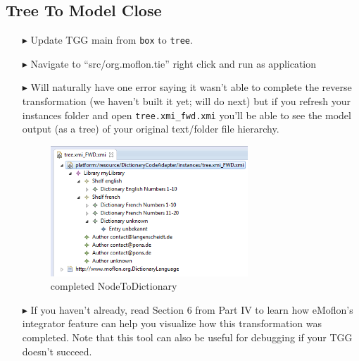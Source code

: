 \newpage
\hypertarget{t2m close}{}
\subsection{Tree To Model Close}
\genHeader

\begin{itemize}

\item[$\blacktriangleright$] Update TGG main from \texttt{box} to \texttt{tree}.

\item[$\blacktriangleright$] Navigate to ``src/org.moflon.tie'' right click and run as application

\item[$\blacktriangleright$] Will naturally have one error saying it wasn't able to complete the reverse transformation (we haven't built it yet; will do next)
but if you refresh your instances folder and open \texttt{tree.xmi\_fwd.xmi} you'll be able to see the model output (as a tree) of your original text/folder
file hierarchy.

\begin{figure}[htbp]
\begin{center}
  \includegraphics[width=0.7\textwidth]{ea_modelToTreeResult}
  \caption{completed NodeToDictionary}
  \label{ea:NodeToDictionary_Complete}
\end{center}
\end{figure}

\item[$\blacktriangleright$] If you haven't already, read Section 6 from Part IV to learn how eMoflon's integrator feature can help you visualize how this
transformation was completed. Note that this tool can also be useful for debugging if your TGG doesn't succeed.

\end{itemize}